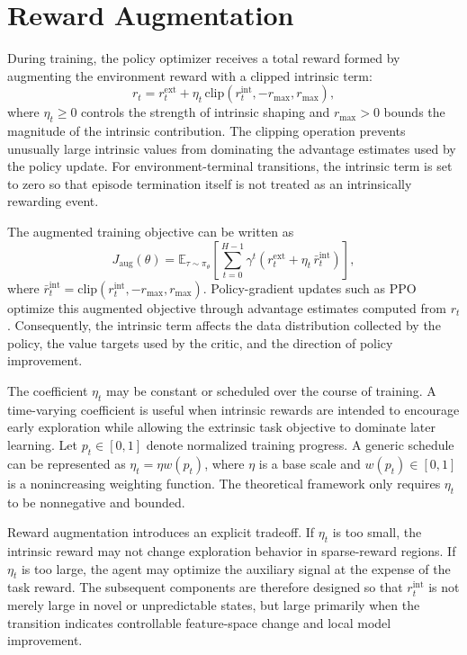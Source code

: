 \section{Reward Augmentation}
\label{sec:reward_augmentation}

During training, the policy optimizer receives a total reward formed by augmenting the environment reward with a clipped intrinsic term:
\begin{equation}
    r_t
    = r_t^{\mathrm{ext}}
    + \eta_t\,\mathrm{clip}\!\left(r_t^{\mathrm{int}},-r_{\max},r_{\max}\right),
    \label{eq:reward_augmentation}
\end{equation}
where $\eta_t\ge 0$ controls the strength of intrinsic shaping and $r_{\max}>0$ bounds the magnitude of the intrinsic contribution.
The clipping operation prevents unusually large intrinsic values from dominating the advantage estimates used by the policy update.
For environment-terminal transitions, the intrinsic term is set to zero so that episode termination itself is not treated as an intrinsically rewarding event.

The augmented training objective can be written as
\begin{equation}
    J_{\mathrm{aug}}(\theta)
    = \mathbb{E}_{\tau\sim\pi_\theta}
    \left[\sum_{t=0}^{H-1}\gamma^t
    \left(r_t^{\mathrm{ext}}+\eta_t\,\bar{r}_t^{\mathrm{int}}\right)
    \right],
\end{equation}
where $\bar{r}_t^{\mathrm{int}}=\mathrm{clip}(r_t^{\mathrm{int}},-r_{\max},r_{\max})$.
Policy-gradient updates such as PPO optimize this augmented objective through advantage estimates computed from $r_t$ \parencite{schulman-2017}.
Consequently, the intrinsic term affects the data distribution collected by the policy, the value targets used by the critic, and the direction of policy improvement.

The coefficient $\eta_t$ may be constant or scheduled over the course of training.
A time-varying coefficient is useful when intrinsic rewards are intended to encourage early exploration while allowing the extrinsic task objective to dominate later learning.
Let $p_t\in[0,1]$ denote normalized training progress.
A generic schedule can be represented as $\eta_t=\eta w(p_t)$, where $\eta$ is a base scale and $w(p_t)\in[0,1]$ is a nonincreasing weighting function.
The theoretical framework only requires $\eta_t$ to be nonnegative and bounded.

Reward augmentation introduces an explicit tradeoff.
If $\eta_t$ is too small, the intrinsic reward may not change exploration behavior in sparse-reward regions.
If $\eta_t$ is too large, the agent may optimize the auxiliary signal at the expense of the task reward.
The subsequent components are therefore designed so that $r_t^{\mathrm{int}}$ is not merely large in novel or unpredictable states, but large primarily when the transition indicates controllable feature-space change and local model improvement.